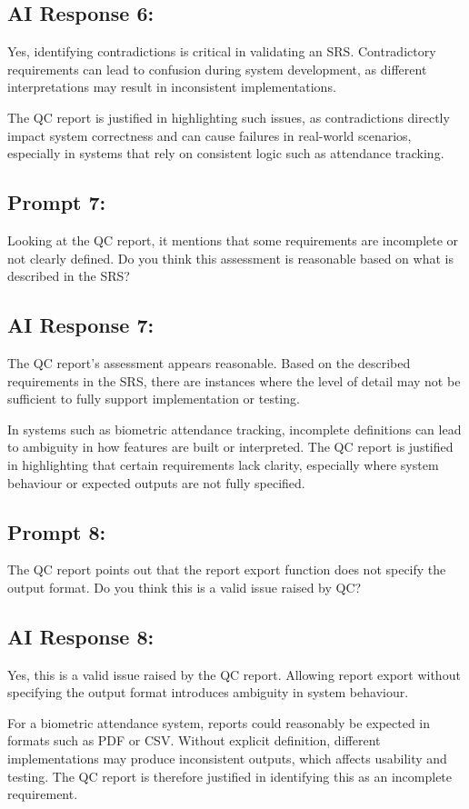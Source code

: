 \documentclass[11pt,a4paper]{article}
\begin{document}
\subsection*{AI Response 6:}

Yes, identifying contradictions is critical in validating an SRS. Contradictory requirements can lead to confusion during system development, as different interpretations may result in inconsistent implementations.

The QC report is justified in highlighting such issues, as contradictions directly impact system correctness and can cause failures in real-world scenarios, especially in systems that rely on consistent logic such as attendance tracking.

\subsection*{Prompt 7:}

Looking at the QC report, it mentions that some requirements are incomplete or not clearly defined. Do you think this assessment is reasonable based on what is described in the SRS?

\subsection*{AI Response 7:}

The QC report’s assessment appears reasonable. Based on the described requirements in the SRS, there are instances where the level of detail may not be sufficient to fully support implementation or testing.

In systems such as biometric attendance tracking, incomplete definitions can lead to ambiguity in how features are built or interpreted. The QC report is justified in highlighting that certain requirements lack clarity, especially where system behaviour or expected outputs are not fully specified.

\subsection*{Prompt 8:}

The QC report points out that the report export function does not specify the output format. Do you think this is a valid issue raised by QC?

\subsection*{AI Response 8:}

Yes, this is a valid issue raised by the QC report. Allowing report export without specifying the output format introduces ambiguity in system behaviour.

For a biometric attendance system, reports could reasonably be expected in formats such as PDF or CSV. Without explicit definition, different implementations may produce inconsistent outputs, which affects usability and testing. The QC report is therefore justified in identifying this as an incomplete requirement.
\end{document}
